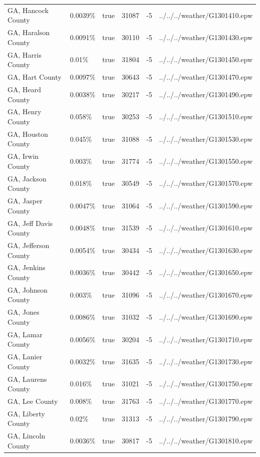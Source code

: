 \begin{longtable}[]{@{}llllll@{}}
GA, Hancock County & 0.0039\% & true & 31087 & -5 &
../../../weather/G1301410.epw \\
GA, Haralson County & 0.0091\% & true & 30110 & -5 &
../../../weather/G1301430.epw \\
GA, Harris County & 0.01\% & true & 31804 & -5 &
../../../weather/G1301450.epw \\
GA, Hart County & 0.0097\% & true & 30643 & -5 &
../../../weather/G1301470.epw \\
GA, Heard County & 0.0038\% & true & 30217 & -5 &
../../../weather/G1301490.epw \\
GA, Henry County & 0.058\% & true & 30253 & -5 &
../../../weather/G1301510.epw \\
GA, Houston County & 0.045\% & true & 31088 & -5 &
../../../weather/G1301530.epw \\
GA, Irwin County & 0.003\% & true & 31774 & -5 &
../../../weather/G1301550.epw \\
GA, Jackson County & 0.018\% & true & 30549 & -5 &
../../../weather/G1301570.epw \\
GA, Jasper County & 0.0047\% & true & 31064 & -5 &
../../../weather/G1301590.epw \\
GA, Jeff Davis County & 0.0048\% & true & 31539 & -5 &
../../../weather/G1301610.epw \\
GA, Jefferson County & 0.0054\% & true & 30434 & -5 &
../../../weather/G1301630.epw \\
GA, Jenkins County & 0.0036\% & true & 30442 & -5 &
../../../weather/G1301650.epw \\
GA, Johnson County & 0.003\% & true & 31096 & -5 &
../../../weather/G1301670.epw \\
GA, Jones County & 0.0086\% & true & 31032 & -5 &
../../../weather/G1301690.epw \\
GA, Lamar County & 0.0056\% & true & 30204 & -5 &
../../../weather/G1301710.epw \\
GA, Lanier County & 0.0032\% & true & 31635 & -5 &
../../../weather/G1301730.epw \\
GA, Laurens County & 0.016\% & true & 31021 & -5 &
../../../weather/G1301750.epw \\
GA, Lee County & 0.008\% & true & 31763 & -5 &
../../../weather/G1301770.epw \\
GA, Liberty County & 0.02\% & true & 31313 & -5 &
../../../weather/G1301790.epw \\
GA, Lincoln County & 0.0036\% & true & 30817 & -5 &
../../../weather/G1301810.epw \\

\end{longtable}
